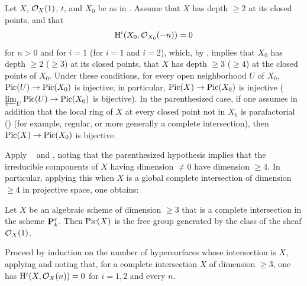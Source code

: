 \begin{corollaire} \label{XII.3.6} Let $X$, $\mathcal O_X(1)$, $t$, and $X_0$ be as in . Assume that $X$ has depth $\geq 2$ at its closed points, and that
\[
\mathrm H^i(X_0, \mathcal O_{X_0}(-n))=0
\]
for $n>0$ and for $i=1$ (\resp for $i=1$ and $i=2$), which, by , implies that $X_0$ has depth $\geq 2$ (\resp $\geq 3$) at its closed points, \ie that $X$ has depth $\geq 3$ (\resp $\geq 4$) at the closed points of $X_0$. Under these conditions, for every open neighborhood $U$ of $X_0$, $\operatorname{Pic}(U)\to\operatorname{Pic}(X_0)$ is injective; in particular, $\operatorname{Pic}(X)\to\operatorname{Pic}(X_0)$ is injective (\resp $\varprojlim_U \operatorname{Pic}(U)\to\operatorname{Pic}(X_0)$ is bijective). In the parenthesized case, if one assumes in addition that the local ring of $X$ at every closed point not in $X_0$ is parafactorial () (for example, regular, or more generally a complete intersection), then $\operatorname{Pic}(X)\to\operatorname{Pic}(X_0)$ is bijective.
\end{corollaire}
Apply ~ and , noting that the parenthesized hypothesis implies that the irreducible components of $X$ having dimension $\neq 0$ have dimension $\geq 4$. In particular, applying this when $X$ is a global complete intersection of dimension $\geq 4$ in projective space, one obtains:

\begin{corollaire} \label{XII.3.7} Let $X$ be an algebraic scheme of dimension $\geq 3$ that is a complete intersection in the scheme $\mathbf P_k^r$. Then $\operatorname{Pic}(X)$ is the free group generated by the class of the sheaf $\mathcal O_X(1)$.
\end{corollaire}
Proceed by induction on the number of hypersurfaces whose intersection is $X$, applying  and noting that, for a complete intersection $X$ of dimension $\geq 3$, one has $\mathrm H^i(X, \mathcal O_X(n))=0$ for $i=1,2$ and every $n$.

